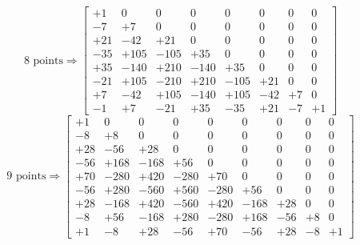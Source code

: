 \documentclass{amsart}
\begin{document}
  \begin{equation*}
    \text{8 points} \Rightarrow
    \begin{bmatrix}
       +1 &    0 &    0 &    0 &    0 &   0 &  0 &  0 \\
       -7 &   +7 &    0 &    0 &    0 &   0 &  0 &  0 \\
      +21 &  -42 &  +21 &    0 &    0 &   0 &  0 &  0 \\
      -35 & +105 & -105 &  +35 &    0 &   0 &  0 &  0 \\
      +35 & -140 & +210 & -140 &  +35 &   0 &  0 &  0 \\
      -21 & +105 & -210 & +210 & -105 & +21 &  0 &  0 \\
       +7 &  -42 & +105 & -140 & +105 & -42 & +7 &  0 \\
       -1 &   +7 &  -21 &  +35 &  -35 & +21 & -7 & +1
    \end{bmatrix}
  \end{equation*}
  \begin{equation*}
    \text{9 points} \Rightarrow
    \begin{bmatrix}
       +1 &    0 &    0 &    0 &    0 &    0 &   0 &  0 &  0 \\
       -8 &   +8 &    0 &    0 &    0 &    0 &   0 &  0 &  0 \\
      +28 &  -56 &  +28 &    0 &    0 &    0 &   0 &  0 &  0 \\
      -56 & +168 & -168 &  +56 &    0 &    0 &   0 &  0 &  0 \\
      +70 & -280 & +420 & -280 &  +70 &    0 &   0 &  0 &  0 \\
      -56 & +280 & -560 & +560 & -280 &  +56 &   0 &  0 &  0 \\
      +28 & -168 & +420 & -560 & +420 & -168 & +28 &  0 &  0 \\
       -8 &  +56 & -168 & +280 & -280 & +168 & -56 & +8 &  0 \\
       +1 &   -8 &  +28 &  -56 &  +70 &  -56 & +28 & -8 & +1
    \end{bmatrix}
  \end{equation*}
\end{document}
